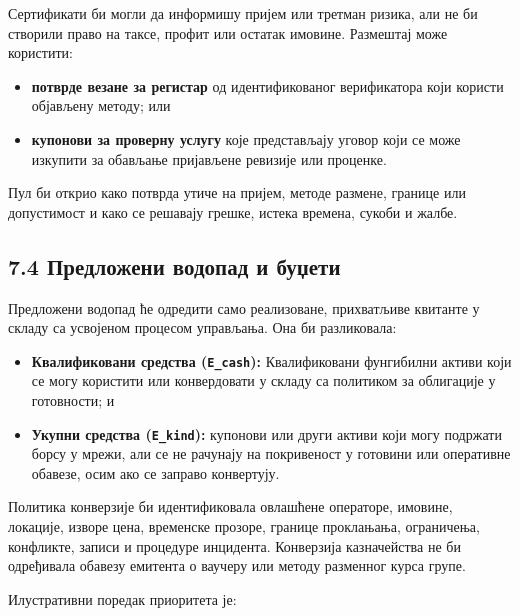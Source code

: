 \documentclass[11pt]{article}
\begin{document}
Сертификати би могли да информишу пријем или третман ризика, али не би створили право на таксе, профит или остатак имовине. Размештај може користити:

\begin{itemize}[leftmargin=*]
\item \textbf{потврде везане за регистар} од идентификованог верификатора који користи објављену методу; или
\item \textbf{купонови за проверну услугу} које представљају уговор који се може изкупити за обављање пријављене ревизије или проценке.
\end{itemize}
Пул би открио како потврда утиче на пријем, методе размене, границе или допустимост и како се решавају грешке, истека времена, сукоби и жалбе.

\subsection*{7.4 Предложени водопад и буџети}

Предложени водопад ће одредити само реализоване, прихватљиве квитанте у складу са усвојеном процесом управљања. Она би разликовала:

\begin{itemize}[leftmargin=*]
\item \textbf{Квалификовани средства (\texttt{E\_cash}):} Квалификовани фунгибилни активи који се могу користити или конвердовати у складу са политиком за облигације у готовности; и
\item \textbf{Укупни средства (\texttt{E\_kind}):} купонови или други активи који могу подржати борсу у мрежи, али се не рачунају на покривеност у готовини или оперативне обавезе, осим ако се заправо конвертују.
\end{itemize}
Политика конверзије би идентификовала овлашћене операторе, имовине, локације, изворе цена, временске прозоре, границе проклањања, ограничења, конфликте, записи и процедуре инцидента. Конверзија казначейства не би одређивала обавезу емитента о ваучеру или методу разменног курса групе.

Илустративни поредак приоритета је:
\end{document}
